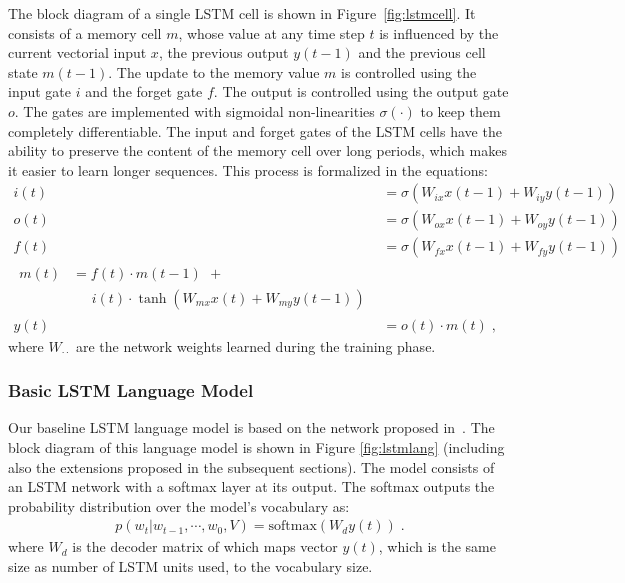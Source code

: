 The block diagram of a single LSTM cell is shown in
Figure~\ref{fig:lstmcell}.  
It consists of a memory cell $m$, whose value at any time step $t$ is
influenced by the current vectorial input $x$, the previous output
$y(t-1)$ and the previous cell state $m(t-1)$.
The update to the memory value $m$ is controlled using the input gate
$i$ and the forget gate $f$.
The output is controlled using the output gate $o$. 
The gates are implemented with sigmoidal non-linearities
$\sigma(\cdot)$ to keep them completely differentiable.
The input and forget gates of the LSTM cells have the ability to
preserve the content of the memory cell over long periods, which makes
it easier to learn longer sequences.
This process is formalized in the equations:
\begin{align}
  \label{eqn:lstmstrt}
  i(t) &= \sigma(W_{ix}x(t-1) + W_{iy}y(t-1))\\
  o(t) &= \sigma(W_{ox}x(t-1) + W_{oy}y(t-1))\\
  f(t) &= \sigma(W_{fx}x(t-1) + W_{fy}y(t-1))\\
  \label{eqn:lstmend}
  \begin{split}
    m(t) &= f(t)\cdot m(t-1) \:\, + \\
    &\; \; \; \; \; i(t)\cdot \tanh(W_{mx}x(t)+W_{my}y(t-1))
  \end{split}\\
  y(t) &= o(t) \cdot m(t) \;,
\end{align}
where $W_{\cdot\cdot}$ are the network weights learned during the
training phase.


\subsubsection{Basic LSTM Language Model}

Our baseline LSTM language model is based on the network proposed
in~\cite{Vinyals_2015_CVPR}.
The block diagram of this language model is shown in Figure
\ref{fig:lstmlang} (including also the extensions proposed in
the subsequent sections).
The model consists of an LSTM network with a softmax layer at its
output. 
The softmax outputs the probability distribution over the model's
vocabulary as:
\begin{align}
p(w_t | w_{t-1},\cdots,w_0, V) = \text{softmax}(W_d y(t)) \;.
\end{align}
\noindent where $W_d$ is the decoder matrix of which maps vector $y(t)$, which
is the same size as number of LSTM units used, to the vocabulary size.

